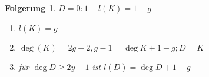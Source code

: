 \documentclass[a4paper,12pt]{report}
\theoremstyle{break}
\newtheorem{Folg}[Def]{Folgerung}
\theoremstyle{nonumberbreak}
\theoremstyle{nonumberplain}
\begin{document}
\begin{Folg}
  $D=0: 1-l(K)=1-g$
  \begin{enumerate}
  \item $l(K)=g$
  \item $\deg(K)=2g-2, g-1=\deg K+1-g; D=K$
  \item für $\deg D\geq 2y-1$ ist $l(D)=\deg D+1-g$
  \end{enumerate}
\end{Folg}


\appendix

\def\indexspace{\par\medskip}
\end{document}

